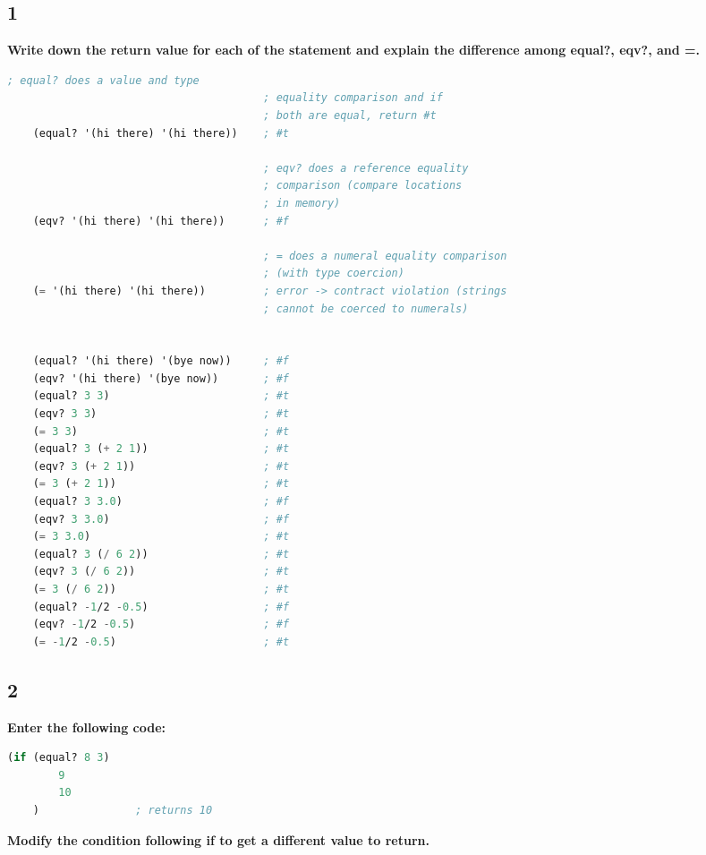 \documentclass{article}
\begin{document}
\subsection*{1}
\begin{adjustwidth}{2em}{0em}
    \textbf{Write down the return value for each of the statement and explain the difference among equal?, eqv?, and =. }
\end{adjustwidth}

\begin{lstlisting}[language=lisp,style=redStyle]
                                        ; equal? does a value and type
                                        ; equality comparison and if
                                        ; both are equal, return #t
    (equal? '(hi there) '(hi there))    ; #t
    
                                        ; eqv? does a reference equality 
                                        ; comparison (compare locations 
                                        ; in memory)
    (eqv? '(hi there) '(hi there))      ; #f 
    
                                        ; = does a numeral equality comparison 
                                        ; (with type coercion)
    (= '(hi there) '(hi there))         ; error -> contract violation (strings
                                        ; cannot be coerced to numerals)
    
    
    (equal? '(hi there) '(bye now))     ; #f
    (eqv? '(hi there) '(bye now))       ; #f
    (equal? 3 3)                        ; #t
    (eqv? 3 3)                          ; #t
    (= 3 3)                             ; #t
    (equal? 3 (+ 2 1))                  ; #t
    (eqv? 3 (+ 2 1))                    ; #t
    (= 3 (+ 2 1))                       ; #t
    (equal? 3 3.0)                      ; #f
    (eqv? 3 3.0)                        ; #f
    (= 3 3.0)                           ; #t
    (equal? 3 (/ 6 2))                  ; #t
    (eqv? 3 (/ 6 2))                    ; #t
    (= 3 (/ 6 2))                       ; #t
    (equal? -1/2 -0.5)                  ; #f
    (eqv? -1/2 -0.5)                    ; #f
    (= -1/2 -0.5)                       ; #t
\end{lstlisting}

\subsection*{2}
\begin{adjustwidth}{2em}{0em}
    \textbf{Enter the following code:}
\end{adjustwidth}
\begin{lstlisting}[language=lisp]
    (if (equal? 8 3) 
        9 
        10
    )               ; returns 10
\end{lstlisting}
\begin{adjustwidth}{2em}{0em}
    \textbf{Modify the condition following if to get a different value to return. }
\end{adjustwidth}
\end{document}
